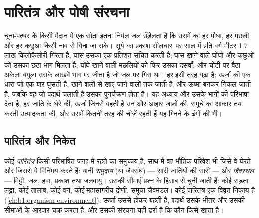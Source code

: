 \chapter{पारितंत्र और पोषी संरचना}\label{ch:b1:ecosystem-organization}

चूना-पत्थर के किसी मैदान में एक सोता इतना निर्मल जल उँड़ेलता है कि उसमें
का हर पौधा, हर मछली और हर कछुआ किसी नाव से गिना जा सके। सूर्य का प्रकाश
सीलघास पर साल में प्रति वर्ग मीटर \qty{1.7}{} लाख किलोकैलोरी गिरता है;
घास उसका एक प्रतिशत संचित करती है; घास खाने वाले घोंघों और कछुओं को उसका
छठा भाग मिलता है; घोंघे खाने वाली मछलियों को फिर उसका दसवाँ; और चोटी पर
बैठा अकेला बगुला उसके लाखवें भाग पर जीता है जो जल पर गिरा था। हर 
इसी तरह गढ़ा है: ऊर्जा की एक धारा जो एक बार घुसती है, खाने वालों से खाए
जाने वालों तक जाती है, और ऊष्मा बनकर निकल जाती है, जबकि वह जो पदार्थ
चलाती है उसका पुनर्चक्रण होता है। यह अध्याय  और उसके भागों की
परिभाषा देता है, हर जाति के घेरे  की, ऊर्जा जिनसे बहती है उन  और आहार जालों की, समूचे का आकार तय करती उत्पादकता की, और उसमें
कितनी तरह की चीज़ें रहती हैं यह गिनने के ढंगों की भी।

\section{पारितंत्र और निकेत}

\begin{definition}[पारितंत्र, जैवस्थल, समुदाय]\label{def:b1:ecosystem-organization:ecosystem}
कोई \emph{पारितंत्र} किसी परिभाषित जगह में रहते  का समुच्चय है, साथ
में वह भौतिक परिवेश भी जिसे वे घेरते और जिससे वे विनिमय करते हैं: यानी
\emph{समुदाय} (या जैवसंघ) --- सारी जातियों की सारी  --- और
\emph{जैवस्थल} --- मिट्टी, जल, हवा, प्रकाश तथा जलवायु। उसकी सीमाएँ प्रश्न
के हिसाब से चुनी जाती हैं: कोई सड़ता लट्ठा, कोई तालाब, कोई वन, कोई
महासागरीय द्रोणी, समूचा जैवमंडल। कोई पारितंत्र एक विवृत निकाय है
(\cref{ch:b1:organism-environment}): ऊर्जा उससे होकर बहती है, पदार्थ उसके
भीतर और उसकी सीमाओं के आरपार चक्र करता है, और उसकी संरचना यही ढर्रा है कि
कौन किसे खाता है।
\end{definition}

